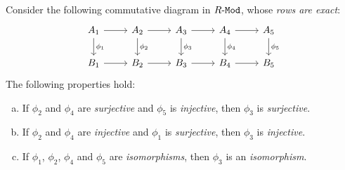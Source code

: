 \begin{proposition}
    \label{prop:five-lemma}
    Consider the following commutative diagram in \({R\text{-}\texttt{Mod}}\), whose \emph{rows are
        exact}:
    \[
        \begin{tikzcd}
            A_1 \ar[r] \ar[d, "\phi_1"]
            &A_2 \ar[r] \ar[d, "\phi_2"]
            &A_3 \ar[r] \ar[d, "\phi_3"]
            &A_4 \ar[r] \ar[d, "\phi_4"]
            &A_5 \ar[d, "\phi_5"]
            \\
            B_1 \ar[r]
            &B_2 \ar[r]
            &B_3 \ar[r]
            &B_4 \ar[r]
            &B_5
        \end{tikzcd}
    \]
    The following properties hold:
    \begin{enumerate}[(a)]\setlength\itemsep{0em}
        \item If \(\phi_2\) and \(\phi_4\) are \emph{surjective} and \(\phi_5\) is
              \emph{injective}, then \(\phi_3\) is \emph{surjective}.
        \item If \(\phi_2\) and \(\phi_4\) are \emph{injective} and \(\phi_1\) is
              \emph{surjective}, then \(\phi_3\) is \emph{injective}.
        \item If \(\phi_1\), \(\phi_2\), \(\phi_4\) and \(\phi_5\) are
              \emph{isomorphisms}, then \(\phi_3\) is an \emph{isomorphism}.
    \end{enumerate}
\end{proposition}

